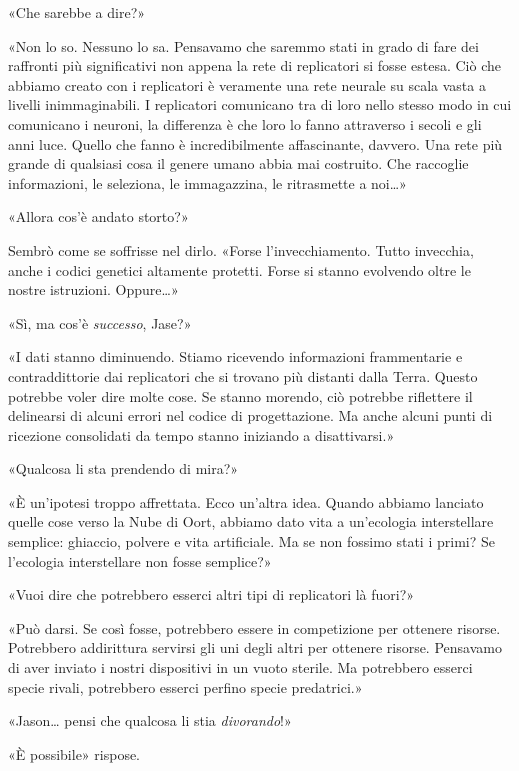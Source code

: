«Che sarebbe a dire?»

«Non lo so. Nessuno lo sa. Pensavamo che saremmo stati in grado di fare
dei raffronti più significativi non appena la rete di replicatori si
fosse estesa. Ciò che abbiamo creato con i replicatori è veramente una
rete neurale su scala vasta a livelli inimmaginabili. I replicatori
comunicano tra di loro nello stesso modo in cui comunicano i neuroni, la
differenza è che loro lo fanno attraverso i secoli e gli anni luce.
Quello che fanno è incredibilmente affascinante, davvero. Una rete più
grande di qualsiasi cosa il genere umano abbia mai costruito. Che
raccoglie informazioni, le seleziona, le immagazzina, le ritrasmette a
noi\ldots»

«Allora cos'è andato storto?»

Sembrò come se soffrisse nel dirlo. «Forse l'invecchiamento. Tutto
invecchia, anche i codici genetici altamente protetti. Forse si stanno
evolvendo oltre le nostre istruzioni. Oppure\ldots»

«Sì, ma cos'è \emph{successo}, Jase?»

«I dati stanno diminuendo. Stiamo ricevendo informazioni frammentarie e
contraddittorie dai replicatori che si trovano più distanti dalla Terra.
Questo potrebbe voler dire molte cose. Se stanno morendo, ciò potrebbe
riflettere il delinearsi di alcuni errori nel codice di progettazione.
Ma anche alcuni punti di ricezione consolidati da tempo stanno iniziando
a disattivarsi.»

«Qualcosa li sta prendendo di mira?»

«È un'ipotesi troppo affrettata. Ecco un'altra idea. Quando abbiamo
lanciato quelle cose verso la Nube di Oort, abbiamo dato vita a
un'ecologia interstellare semplice: ghiaccio, polvere e vita
artificiale. Ma se non fossimo stati i primi? Se l'ecologia
interstellare non fosse semplice?»

«Vuoi dire che potrebbero esserci altri tipi di replicatori là fuori?»

«Può darsi. Se così fosse, potrebbero essere in competizione per
ottenere risorse. Potrebbero addirittura servirsi gli uni degli altri
per ottenere risorse. Pensavamo di aver inviato i nostri dispositivi in
un vuoto sterile. Ma potrebbero esserci specie rivali, potrebbero
esserci perfino specie predatrici.»

«Jason\ldots{} pensi che qualcosa li stia \emph{divorando}!»

«È possibile» rispose.

\separatorefiori

